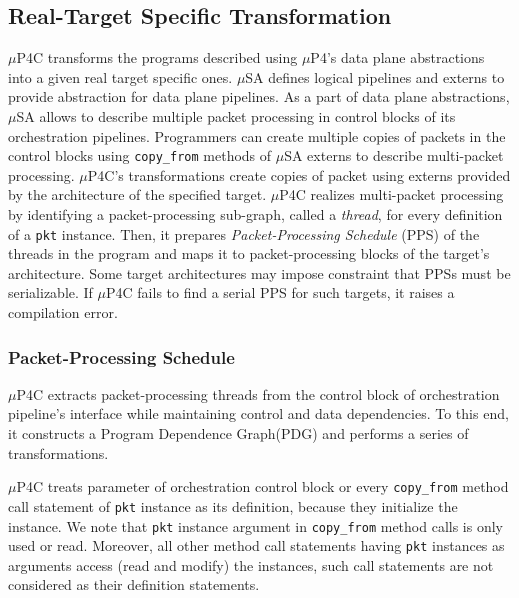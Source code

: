 \subsection{Real-Target Specific Transformation}
$\mu$P4C transforms the programs described using $\mu$P4's data plane abstractions into a given real target specific ones.
$\mu$SA defines logical pipelines and externs to provide abstraction for data plane pipelines.
As a part of data plane abstractions, $\mu$SA allows to describe multiple packet processing in control blocks of its orchestration pipelines.
Programmers can create multiple copies of packets in the control blocks using \texttt{copy\_from} methods of $\mu$SA externs to describe multi-packet processing.
$\mu$P4C's transformations create copies of packet using externs provided by the architecture of the specified target.
$\mu$P4C realizes multi-packet processing by identifying a packet-processing sub-graph, called a \emph{thread}, for every definition of a \texttt{pkt} instance.
Then, it prepares \emph{Packet-Processing Schedule} (PPS) of the threads in the program and maps it to packet-processing blocks of the target's architecture.
Some target architectures may impose constraint that PPSs must be serializable.
If $\mu$P4C fails to find a serial PPS for such targets, it raises a compilation error. 


\subsubsection{Packet-Processing Schedule}
$\mu$P4C extracts packet-processing threads from the control block of orchestration pipeline's interface while maintaining control and data dependencies.
To this end, it constructs a Program Dependence Graph(PDG) \cite{Ferrante:1987:PDG:24039.24041} and performs a series of transformations.

$\mu$P4C treats parameter of orchestration control block or every \texttt{copy\_from} method call statement of \texttt{pkt} instance as its definition, because they initialize the instance.
We note that \texttt{pkt} instance argument in \texttt{copy\_from} method calls is only used or read.
Moreover, all other method call statements having \texttt{pkt} instances as arguments access (read and modify) the instances, such call statements are not considered as their definition statements.


